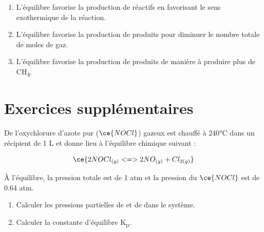 \documentclass[
  11pt,
  a4paper,
  openany]{book}
\providecommand{\tightlist}{%
  \setlength{\itemsep}{0pt}\setlength{\parskip}{0pt}}
\begin{document}
\begin{Answer}

\begin{enumerate}
\def\labelenumi{\alph{enumi}.}
\tightlist
\item
  L'équilibre favorise la production de réactifs en favorisant le sens exothermique de la réaction.
\item
  L'équilibre favorise la production de produits pour diminuer le nombre totale de moles de gaz.
\item
  L'équilibre favorise la production de produits de manière à produire plus de CH\textsubscript{4}.
\end{enumerate}

\end{Answer}

\section{Exercices supplémentaires}\label{exercices-suppluxe9mentaires-12}

\begin{Exercise}

De l'oxychlorure d'azote pur (\(\ce{NOCl}\)) gazeux est chauffé à 240°C dans un récipient de 1 L et donne lieu à l'équilibre chimique suivant :

\[
\ce{2 NOCl_{(g)} <=> 2 NO_{(g)} + Cl_{2(g)}}
\]

À l'équilibre, la pression totale est de 1 atm et la pression du \(\ce{NOCl}\) est de 0.64 atm.

\begin{enumerate}
\def\labelenumi{\alph{enumi}.}
\tightlist
\item
  Calculer les pressions partielles de  et de  dans le système.
\item
  Calculer la constante d'équilibre K\textsubscript{p}.
\end{enumerate}

\end{Exercise}
\end{document}

